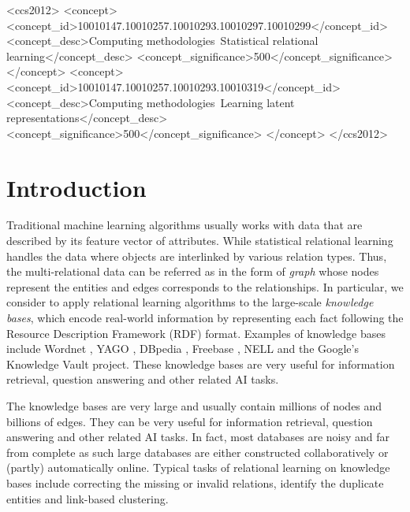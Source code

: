 \documentclass[9pt]{sig-alternate-05-2015}
\begin{document}
\begin{CCSXML}
<ccs2012>
<concept>
<concept_id>10010147.10010257.10010293.10010297.10010299</concept_id>
<concept_desc>Computing methodologies~Statistical relational learning</concept_desc>
<concept_significance>500</concept_significance>
</concept>
<concept>
<concept_id>10010147.10010257.10010293.10010319</concept_id>
<concept_desc>Computing methodologies~Learning latent representations</concept_desc>
<concept_significance>500</concept_significance>
</concept>
</ccs2012>
\end{CCSXML}



%
%

%
%
\printccsdesc



\section{Introduction}
Traditional machine learning algorithms usually works with data that are described by its feature vector of attributes. While statistical relational learning handles the data where objects are interlinked by various relation types. Thus, the multi-relational data can be referred as in the form of \emph{graph} whose nodes represent the entities and edges corresponds to the relationships. In particular, we consider to apply relational learning algorithms to the large-scale \emph{knowledge bases}, which encode real-world information by representing each fact following the Resource Description Framework (RDF) format.  Examples of knowledge bases include Wordnet \cite{miller_wordnet:_1995}, YAGO \cite{suchanek_yago:_2007}, DBpedia \cite{lehmann_dbpedialarge-scale_2015}, Freebase \cite{bollacker_freebase:_2008}, NELL \cite{betteridge_toward_2009} and the Google's Knowledge Vault project\cite{dong_knowledge_2014}.  These knowledge bases are very useful for information retrieval, question answering and other related AI tasks.

The knowledge bases are very large and usually contain millions of nodes and billions of edges. They can be very useful for information retrieval, question answering and other related AI tasks. In fact, most databases are noisy and far from complete as such large databases are either constructed collaboratively or (partly) automatically online. Typical tasks of relational learning on knowledge bases include correcting the missing or invalid relations, identify the duplicate entities and link-based clustering. 
\end{document}
